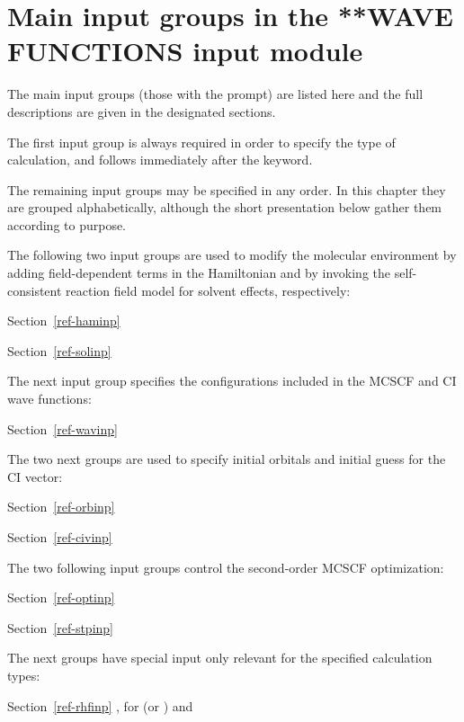 \pagebreak[3]
\section{\label{sec:ref-newinp}
   Main input groups in the **WAVE FUNCTIONS input module}

\noindent
The main input groups (those with the {\starkey} prompt) are listed here and
the full descriptions are given in the designated sections.

\noindent
The first input group is always required in order to specify the type of
calculation, and follows immediately after the 
keyword.


\noindent The remaining input groups may be specified in any
order. In this chapter they are grouped alphabetically, although
the short presentation below gather them according to purpose.

The following two input groups are used to modify the
molecular environment by adding field-dependent
terms in the Hamiltonian and by invoking
the self-consistent reaction field model for solvent
effects, respectively:

Section~\ref{ref-haminp} 

Section~\ref{ref-solinp} 
%

\noindent
The next input group specifies the configurations included
in the MCSCF and CI wave functions:

Section~\ref{ref-wavinp} 

\noindent
The two next groups are used to specify initial orbitals and initial
guess for the CI vector:

Section~\ref{ref-orbinp} 

Section~\ref{ref-civinp} 

\noindent
The two following input groups control the second-order MCSCF
optimization:

Section~\ref{ref-optinp} 

Section~\ref{ref-stpinp} 

\noindent
The next groups have special input only relevant for the
specified calculation types:

Section~\ref{ref-rhfinp} , for  (or ) and 

